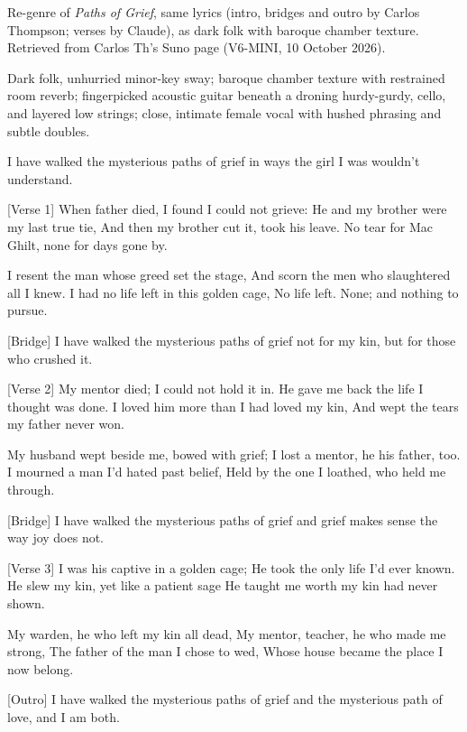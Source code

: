 \begin{notes}
Re-genre of \emph{Paths of Grief}, same lyrics (intro, bridges and outro by Carlos Thompson; verses by Claude), as dark folk with baroque chamber texture. Retrieved from Carlos Th's Suno page (V6-MINI, 10 October 2026).
\end{notes}
\begin{style}
Dark folk, unhurried minor-key sway; baroque chamber texture with restrained room reverb; fingerpicked acoustic guitar beneath a droning hurdy-gurdy, cello, and layered low strings; close, intimate female vocal with hushed phrasing and subtle doubles.
\end{style}
\begin{lyrics}
[Intro]
I have walked the mysterious paths of grief
in ways the girl I was wouldn't understand.

[Verse 1]
When father died, I found I could not grieve:
He and my brother were my last true tie,
And then my brother cut it, took his leave.
No tear for Mac Ghilt, none for days gone by.

I resent the man whose greed set the stage,
And scorn the men who slaughtered all I knew.
I had no life left in this golden cage,
No life left. None; and nothing to pursue.

[Bridge]
I have walked the mysterious paths of grief
not for my kin, but for those who crushed it.

[Verse 2]
My mentor died; I could not hold it in.
He gave me back the life I thought was done.
I loved him more than I had loved my kin,
And wept the tears my father never won.

My husband wept beside me, bowed with grief;
I lost a mentor, he his father, too.
I mourned a man I’d hated past belief,
Held by the one I loathed, who held me through.

[Bridge]
I have walked the mysterious paths of grief
and grief makes sense the way joy does not.

[Verse 3]
I was his captive in a golden cage;
He took the only life I’d ever known.
He slew my kin, yet like a patient sage
He taught me worth my kin had never shown.

My warden, he who left my kin all dead,
My mentor, teacher, he who made me strong,
The father of the man I chose to wed,
Whose house became the place I now belong.

[Outro]
I have walked the mysterious paths of grief
and the mysterious path of love,
and I am both.
\end{lyrics}

